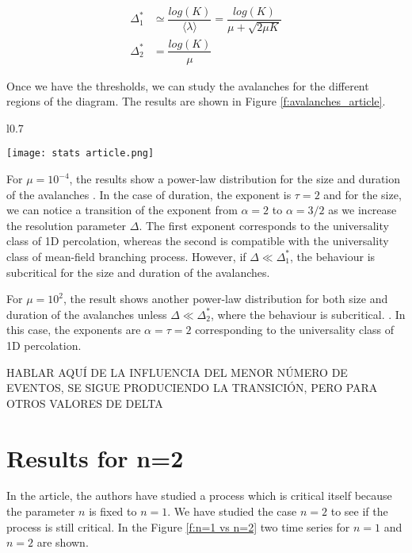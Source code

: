 \begin{align}
    \Delta_1^* &\simeq \dfrac{log(K)}{\langle \lambda \rangle}= \dfrac{log(K)}{\mu+\sqrt{2\mu K}} \label{eq:Ecuación delta1 *} \\
    \Delta_2^* &= \dfrac{log(K)}{\mu}\label{eq:Ecuación delta2 *}
\end{align}

Once we have the thresholds, we can study the avalanches for the different regions of the diagram. The results are shown in Figure \ref{f:avalanches_article}.

\begin{wrapfigure}{l}{0.7\textwidth}
    \begin{center}
      \texttt{[image: stats article.png]}
    \end{center}
    \caption{Avalanche statistics for a self-exciting Hawkes process with $n=1$ for $K=10^5$ events averaged over $R=1000$ realizations.}
    \label{f:avalanches_article}
\end{wrapfigure}

For $\mu = 10^{-4}$, the results show a power-law distribution for the size and duration of the avalanches
. In the case of duration, the exponent is $\tau=2$ and for the size, we can notice a  
transition of the exponent from $\alpha =2$ to $\alpha =3/2$ as we increase the resolution parameter $\Delta$.
The first exponent corresponds to the universality class of 1D percolation, whereas the second is compatible with the universality class of mean-field branching process.
However, if $\Delta\ll \Delta_1^*$, the behaviour is subcritical for the size and duration of the avalanches.

For $\mu = 10^2$, the result shows another power-law distribution for both size and duration of the avalanches unless $\Delta\ll \Delta_2^*$, where the behaviour is subcritical.
. In this case, the exponents are $\alpha=\tau=2$ corresponding to the universality 
class of 1D percolation.

HABLAR AQUÍ DE LA INFLUENCIA DEL MENOR NÚMERO DE EVENTOS, SE SIGUE PRODUCIENDO LA TRANSICIÓN, PERO PARA OTROS VALORES DE DELTA

\section{Results for n=2}

In the article, the authors have studied a process which is critical itself because the parameter $n$ is fixed to $n=1$. We have studied the case $n=2$ to see if the process is still critical. 
In the Figure \ref{f:n=1 vs n=2} two time series for $n=1$ and $n=2$ are shown. 

